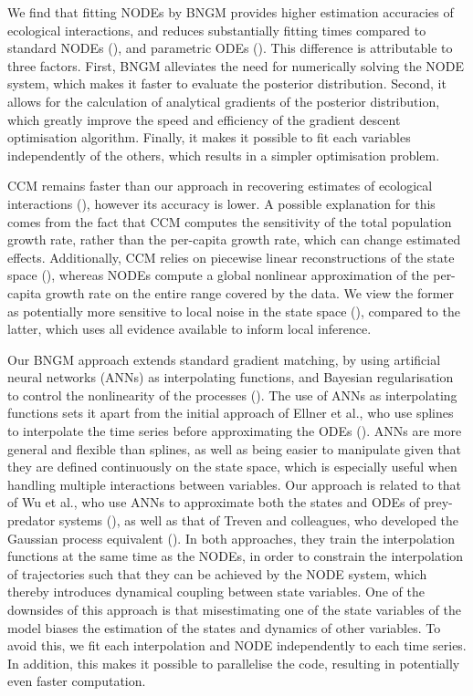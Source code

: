 \documentclass[11pt, oneside]{article}
\begin{document}
We find that fitting NODEs by BNGM provides higher estimation accuracies of ecological interactions, and reduces substantially fitting times compared to standard NODEs (\cite{Bonnaffe2021a}), and parametric ODEs (\cite{Rosenbaum2019}).
This difference is attributable to three factors.
First, BNGM alleviates the need for numerically solving the NODE system, which makes it faster to evaluate the posterior distribution.
Second, it allows for the calculation of analytical gradients of the posterior distribution, which greatly improve the speed and efficiency of the gradient descent optimisation algorithm.
Finally, it makes it possible to fit each variables independently of the others, which results in a simpler optimisation problem.

CCM remains faster than our approach in recovering estimates of ecological interactions (\cite{Sugihara2012}), however its accuracy is lower.
A possible explanation for this comes from the fact that CCM computes the sensitivity of the total population growth rate, rather than the per-capita growth rate, which can change estimated effects.
Additionally, CCM relies on piecewise linear reconstructions of the state space (\cite{Deyle2015}), whereas NODEs compute a global nonlinear approximation of the per-capita growth rate on the entire range covered by the data.
We view the former as potentially more sensitive to local noise in the state space (\cite{Cenci2019a}), compared to the latter, which uses all evidence available to inform local inference.

Our BNGM approach extends standard gradient matching, by using artificial neural networks (ANNs) as interpolating functions, and Bayesian regularisation to control the nonlinearity of the processes (\cite{Cawley2007}).
The use of ANNs as interpolating functions sets it apart from the initial approach of Ellner et al., who use splines to interpolate the time series before approximating the ODEs (\cite{Ellner2002}).
ANNs are more general and flexible than splines, as well as being easier to manipulate given that they are defined continuously on the state space, which is especially useful when handling multiple interactions between variables.
Our approach is related to that of Wu et al., who use ANNs to approximate both the states and ODEs of prey-predator systems (\cite{Wu2005}), as well as that of Treven and colleagues, who developed the Gaussian process equivalent (\cite{Treven2021}).
In both approaches, they train the interpolation functions at the same time as the NODEs, in order to constrain the interpolation of trajectories such that they can be achieved by the NODE system, which thereby introduces dynamical coupling between state variables.
One of the downsides of this approach is that misestimating one of the state variables of the model biases the estimation of the states and dynamics of other variables.
To avoid this, we fit each interpolation and NODE independently to each time series.
In addition, this makes it possible to parallelise the code, resulting in potentially even faster computation.
\end{document}
